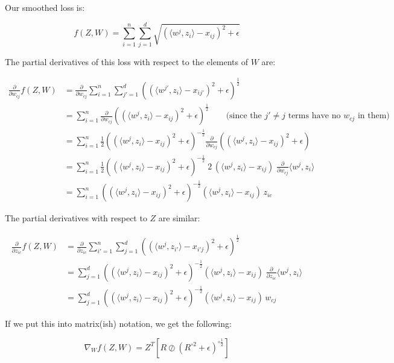 \documentclass{article}
\begin{document}
Our smoothed loss is:

\[
f(Z,W) = \sum_{i=1}^n\sum_{j=1}^d \sqrt{(\langle w^j, z_i\rangle - x_{ij})^2 + \epsilon }
\]

The partial derivatives of this loss with respect to the elements of $W$ are:

\begin{align*}
\frac{\partial}{\partial w_{cj}} f(Z,W)
  &= \frac{\partial}{\partial w_{cj}} \sum_{i=1}^n\sum_{j'=1}^d \left( (\langle w^{j'}, z_i\rangle - x_{ij'})^2 + \epsilon \right)^{\frac12} \\
  &= \sum_{i=1}^n \frac{\partial}{\partial w_{cj}} \left( (\langle w^{j}, z_i\rangle - x_{ij})^2 + \epsilon \right)^{\frac12}  \qquad \text{(since the $j' \ne j$ terms have no $w_{cj}$ in them)} \\
  &= \sum_{i=1}^n \frac12 \left( (\langle w^{j}, z_i\rangle - x_{ij})^2 + \epsilon \right)^{-\frac12} \frac{\partial}{\partial w_{cj}} \left( (\langle w^{j}, z_i\rangle - x_{ij})^2 + \epsilon \right) \\
  &= \sum_{i=1}^n \frac12  \left( (\langle w^{j}, z_i\rangle - x_{ij})^2 + \epsilon \right)^{-\frac12} \;2\,  (\langle w^{j}, z_i\rangle - x_{ij}) \; \frac{\partial}{\partial w_{cj}} \langle w^{j}, z_i\rangle \\
  &= \sum_{i=1}^n \left( (\langle w^{j}, z_i\rangle - x_{ij})^2 + \epsilon \right)^{-\frac12}  (\langle w^j, z_i\rangle - x_{ij}) \, z_{ic}
\end{align*}

The partial derivatives with respect to $Z$ are similar:

\begin{align*}
\frac{\partial}{\partial z_{ic}} f(Z,W)
  &= \frac{\partial}{\partial z_{ic}} \sum_{i'=1}^n \sum_{j=1}^d  \left( (\langle w^j, z_{i'}\rangle - x_{i'j})^2 + \epsilon \right)^{\frac12}\\
  &= \sum_{j=1}^d  \left( (\langle w^j, z_{i}\rangle - x_{ij})^2 + \epsilon \right)^{-\frac12}   (\langle w^j, z_{i}\rangle - x_{ij}) \; \frac{\partial}{\partial z_{ic}} \langle w^j, z_i\rangle \\
  &= \sum_{j=1}^d  \left( (\langle w^j, z_i\rangle - x_{ij})^2 + \epsilon \right)^{-\frac12}  (\langle w^j, z_i\rangle - x_{ij}) \, w_{cj}
\end{align*}

If we put this into matrix(ish) notation, we get the following:

\[
\nabla_W f(Z,W) = Z^T \left[ R \oslash \left(R^{\circ 2} + \epsilon\right)^{\circ \frac12}  \right]
\]
\end{document}
